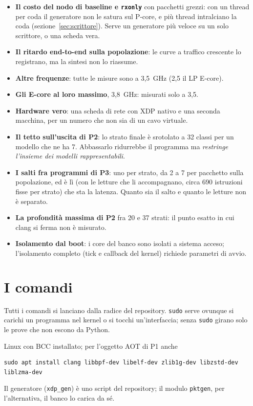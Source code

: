 \documentclass[11pt,a4paper,oneside]{report}
\begin{document}
\begin{itemize}
\item \textbf{Il costo del nodo di baseline e \texttt{rxonly}} con pacchetti
      grezzi: con un thread per coda il generatore non le satura sul P-core, e
      più thread intralciano la coda (sezione~\ref{sec:scrittore}). Serve un
      generatore più veloce su un solo scrittore, o una scheda vera.
\item \textbf{Il ritardo end-to-end sulla popolazione}: le curve a traffico
      crescente lo registrano, ma la sintesi non lo riassume.
\item \textbf{Altre frequenze}: tutte le misure sono a 3,5~GHz (2,5 il LP E-core).
\item \textbf{Gli E-core al loro massimo}, 3,8~GHz: misurati solo a 3,5.
\item \textbf{Hardware vero}: una scheda di rete con XDP nativo e una seconda
      macchina, per un numero che non sia di un cavo virtuale.
\item \textbf{Il tetto sull'uscita di P2}: lo strato finale è srotolato a 32
      classi per un modello che ne ha 7. Abbassarlo ridurrebbe il programma ma
      \emph{restringe l'insieme dei modelli rappresentabili}.
\item \textbf{I salti fra programmi di P3}: uno per strato, da 2 a 7 per
      pacchetto sulla popolazione, ed è lì (con le letture che li accompagnano,
      circa 690 istruzioni fisse per strato) che sta la latenza. Quanto sia il
      salto e quanto le letture non è separato.
\item \textbf{La profondità massima di P2} fra 20 e 37 strati: il punto esatto in
      cui clang si ferma non è misurato.
\item \textbf{Isolamento dal boot}: i core del banco sono isolati a sistema acceso;
      l'isolamento completo (tick e callback del kernel) richiede parametri di
      avvio.
\end{itemize}

\chapter{I comandi}

Tutti i comandi si lanciano dalla radice del repository. \texttt{sudo} serve
ovunque si carichi un programma nel kernel o si tocchi un'interfaccia; senza
\texttt{sudo} girano solo le prove che non escono da Python.

\begin{prima}[Prerequisiti]
Linux con BCC installato; per l'oggetto AOT di P1 anche
\begin{lstlisting}
sudo apt install clang libbpf-dev libelf-dev zlib1g-dev libzstd-dev liblzma-dev
\end{lstlisting}
Il generatore (\texttt{xdp\_gen}) è uno script del repository; il modulo
\texttt{pktgen}, per l'alternativa, il banco lo carica da sé.
\end{prima}
\end{document}
